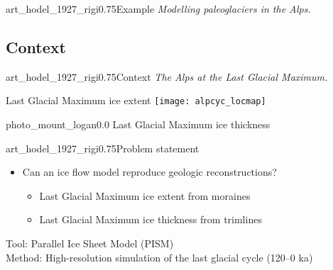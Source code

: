 
    \begin{sectionframe}{art_hodel_1927_rigi}{0.75}{Example}
      \emph{Modelling paleoglaciers in the Alps.}
    \end{sectionframe}

\subsection{Context}

    \begin{sectionframe}{art_hodel_1927_rigi}{0.75}{Context}
      \emph{The Alps at the Last Glacial Maximum.}
    \end{sectionframe}

    \begin{frame}{Last Glacial Maximum ice extent}
      \texttt{[image: alpcyc\_locmap]}
    \end{frame}

    \begin{backgroundframe}{photo_mount_logan}{0.0}
          {Last Glacial Maximum ice thickness}
    \end{backgroundframe}

    \begin{sectionframe}{art_hodel_1927_rigi}{0.75}{Problem statement}
      \begin{itemize}
        \item Can an ice flow model reproduce geologic reconstructions?
          \begin{itemize}
            \item Last Glacial Maximum ice \alert{extent} from moraines
            \item Last Glacial Maximum ice \alert{thickness} from trimlines
          \end{itemize}
      \end{itemize}
      \bigskip\bigskip\bigskip\pause
      Tool: Parallel Ice Sheet Model (PISM)\\
      \bigskip
      Method: High-resolution simulation of the last glacial cycle (120--0 ka)
    \end{sectionframe}


